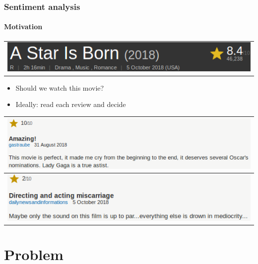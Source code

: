 \documentclass{beamer}
\begin{document}
\begin{frame}
	\frametitle{Sentiment analysis}
	\framesubtitle{Motivation}
	\begin{center}
	\begin{tabular}{c}
		\includegraphics[scale=0.5]{imdb_star} \\
	\end{tabular}
	\end{center}
	\begin{itemize}
		\item Should we watch this movie? \pause
		\item Ideally: read each review and decide
	\end{itemize}
	\begin{center}
	\begin{tabular}{l}
		\includegraphics[scale=0.5]{imdb_review_pos_exag} \pause \\ \hline \hline
		\includegraphics[scale=0.5]{imdb_review_neg}
	\end{tabular}
	\end{center}

\end{frame}

\section{Problem}
\end{document}
